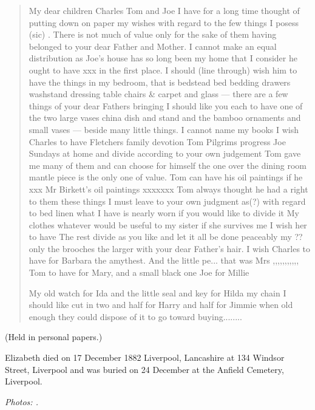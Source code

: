 \begin{quotation}
My dear children Charles Tom and Joe I have for a long time thought of putting down on paper my wishes with regard to the few things I posess (sic) . There is not much of value only for the sake of them having belonged to your dear Father and Mother. I cannot make an equal distribution as Joe’s house has so long been my home that I consider he ought to have xxx in the first place. I should (line through) wish him to have the things in my bedroom, that is bedstead bed bedding drawers washstand dressing table chairs \& carpet and glass --- there are a few things of your dear Fathers bringing I should like you each to have one of the two large vases china dish and stand and the bamboo ornaments and small vases --- beside many little things. I cannot name my books I wish Charles to have Fletchers family devotion Tom Pilgrims progress Joe Sundays at home and divide according to your own judgement Tom gave me many of them and can choose for himself the one over the dining room mantle piece is the only one of value. Tom can have his oil paintings if he xxx Mr Birkett’s oil paintings xxxxxxx Tom always thought he had a right to them these things I must leave to your own judgment as(?) with regard to bed linen what I have is nearly worn if you would like to divide it My clothes whatever would be useful to my sister if she survives me I wish her to have The rest divide as you like and let it all be done peaceably my ?? only the brooches the larger with your dear Father’s hair. I wish Charles to have for Barbara the amythest. And the little pe... that was Mrs ,,,,,,,,,,, Tom to have for Mary, and a small black one Joe for Millie

My old watch for Ida and the little seal and key for Hilda my chain I should like cut in two and half for Harry and half for Jimmie when old enough they could dispose of it to go toward buying........
\end{quotation}

(Held in personal papers.)

Elizabeth died on 17 December 1882 Liverpool, Lancashire at 134 Windsor Street, Liverpool and was buried on 24 December at the Anfield Cemetery, Liverpool. \cite{EHazelwoodDeath}

\emph{Photos: .}
